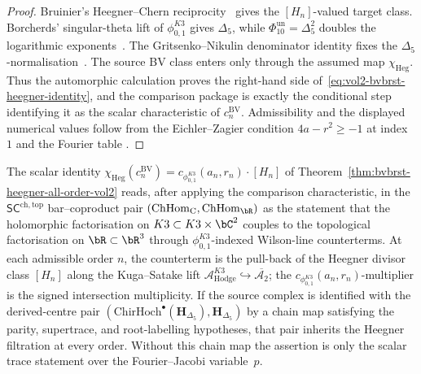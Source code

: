 \begin{proof}
Bruinier's Heegner--Chern reciprocity~\cite[Prop.~5.1]{Bruinier2002}
gives the \( [H_n] \)-valued target class. Borcherds' singular-theta
lift of \(\phi_{0,1}^{K3}\) gives \(\Delta_5\), while
\(\Phi_{10}^{\mathrm{un}}=\Delta_5^2\) doubles the logarithmic
exponents~\cite[Theorem 10.1]{Borcherds1998}. The
Gritsenko--Nikulin denominator identity fixes the
\(\Delta_5\)-normalisation~\cite[Thm.~2.1]{GritsenkoNikulin1998}.
The source BV class enters only through the assumed map
\(\chi_{\mathrm{Heg}}\). Thus the automorphic calculation proves the
right-hand side of~\eqref{eq:vol2-bvbrst-heegner-identity}, and the
comparison package is exactly the conditional step identifying it as
the scalar characteristic of \(c_n^{\mathrm{BV}}\). Admissibility and
the displayed numerical values follow from the Eichler--Zagier condition
\(4a-r^2\geq -1\) at index \(1\)
\cite[Theorem 9.3]{EichlerZagier1985} and the Fourier table
\cite[Table 1, p.~141]{EichlerZagier1985}.
\end{proof}

\begin{remark}
\label{rem:vol2-bvbrst-heegner-sc-reading}
The scalar identity
\(\chi_{\mathrm{Heg}}(c_n^{\mathrm{BV}})
	=c_{\phi_{0,1}^{K3}}(a_n,r_n)\cdot[H_n]\) of
Theorem~\ref{thm:bvbrst-heegner-all-order-vol2} reads, after applying
the comparison characteristic, in the
$\mathsf{SC}^{\mathrm{ch,top}}$ bar--coproduct pair
$(\mathrm{ChHom}_\mathrm{C}, \mathrm{ChHom}_\bR)$ as the statement that
the holomorphic factorisation on $K3\subset K3\times\bC^2$ couples to
the topological factorisation on $\bR\subset\bR^3$ through
\(\phi_{0,1}^{K3}\)-indexed Wilson-line counterterms. At each admissible
order $n$, the counterterm is the pull-back of the Heegner divisor class
$[H_n]$ along the Kuga--Satake lift
$\mathcal{A}^{K3}_{\mathrm{Hodge}}\hookrightarrow\overline{\mathcal{A}_2}$;
the \(c_{\phi_{0,1}^{K3}}(a_n,r_n)\)-multiplier is the signed intersection
multiplicity. If the source complex is identified with the
derived-centre pair
$(\mathrm{ChirHoch}^\bullet(\mathbf{H}_{\Delta_5}), \mathbf{H}_{\Delta_5})$
by a chain map satisfying the parity, supertrace, and root-labelling
hypotheses, that pair inherits the Heegner filtration at every order.
Without this chain map the assertion is only the scalar trace statement
over the Fourier--Jacobi variable~$p$.
\end{remark}

